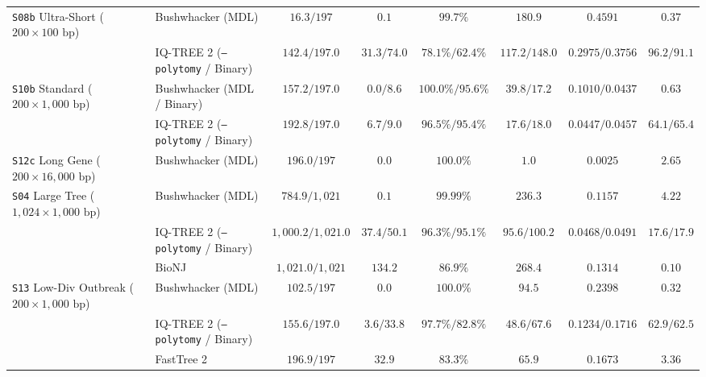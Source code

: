 \documentclass[12pt]{article}
\begin{document}
\begin{table}[H]
{\begin{tabular}{@{}llcccccc@{}}
\texttt{S08b} Ultra-Short ($200 \times 100\text{ bp}$) & Bushwhacker (MDL) & $16.3 / 197$ & $0.1$ & $99.7\%$ & $180.9$ & $0.4591$ & $0.37$ \\
& IQ-TREE 2 (\texttt{--polytomy} / Binary) & $142.4 / 197.0$ & $31.3 / 74.0$ & $78.1\% / 62.4\%$ & $117.2 / 148.0$ & $0.2975 / 0.3756$ & $96.2 / 91.1$ \\
\texttt{S10b} Standard ($200 \times 1{,}000\text{ bp}$) & Bushwhacker (MDL / Binary) & $157.2 / 197.0$ & $0.0 / 8.6$ & $100.0\% / 95.6\%$ & $39.8 / 17.2$ & $0.1010 / 0.0437$ & $0.63$ \\
& IQ-TREE 2 (\texttt{--polytomy} / Binary) & $192.8 / 197.0$ & $6.7 / 9.0$ & $96.5\% / 95.4\%$ & $17.6 / 18.0$ & $0.0447 / 0.0457$ & $64.1 / 65.4$ \\
\texttt{S12c} Long Gene ($200 \times 16{,}000\text{ bp}$) & Bushwhacker (MDL) & $196.0 / 197$ & $0.0$ & $100.0\%$ & $1.0$ & $0.0025$ & $2.65$ \\
\texttt{S04} Large Tree ($1{,}024 \times 1{,}000\text{ bp}$) & Bushwhacker (MDL) & $784.9 / 1{,}021$ & $0.1$ & $99.99\%$ & $236.3$ & $0.1157$ & $4.22$ \\
& IQ-TREE 2 (\texttt{--polytomy} / Binary) & $1{,}000.2 / 1{,}021.0$ & $37.4 / 50.1$ & $96.3\% / 95.1\%$ & $95.6 / 100.2$ & $0.0468 / 0.0491$ & $17.6 / 17.9$ \\
& BioNJ \cite{gascuel1997bionj} & $1{,}021.0 / 1{,}021$ & $134.2$ & $86.9\%$ & $268.4$ & $0.1314$ & $0.10$ \\
\texttt{S13} Low-Div Outbreak ($200 \times 1{,}000\text{ bp}$) & Bushwhacker (MDL) & $102.5 / 197$ & $0.0$ & $100.0\%$ & $94.5$ & $0.2398$ & $0.32$ \\
& IQ-TREE 2 (\texttt{--polytomy} / Binary) & $155.6 / 197.0$ & $3.6 / 33.8$ & $97.7\% / 82.8\%$ & $48.6 / 67.6$ & $0.1234 / 0.1716$ & $62.9 / 62.5$ \\
& FastTree 2 & $196.9 / 197$ & $32.9$ & $83.3\%$ & $65.9$ & $0.1673$ & $3.36$ \\
\bottomrule
\end{tabular}%
}
\end{table}
\end{document}
